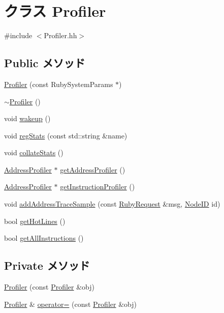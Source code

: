 \hypertarget{classProfiler}{
\section{クラス Profiler}
\label{classProfiler}
}


{\ttfamily \#include $<$Profiler.hh$>$}\subsection*{Public メソッド}
\begin{DoxyCompactItemize}
\item 
\hyperlink{classProfiler_ab2c59c9f25786669282690a23306cd69}{Profiler} (const RubySystemParams $\ast$)
\item 
\hyperlink{classProfiler_aa0f87e10a29a76f6358f43b09621df51}{$\sim$Profiler} ()
\item 
void \hyperlink{classProfiler_ae674290a26ecbd622c5160e38e8a4fe9}{wakeup} ()
\item 
void \hyperlink{classProfiler_a3dd3443357312bcb75580eaa508c48a4}{regStats} (const std::string \&name)
\item 
void \hyperlink{classProfiler_a208669cbc0bb1d52565956ca8c690c55}{collateStats} ()
\item 
\hyperlink{classAddressProfiler}{AddressProfiler} $\ast$ \hyperlink{classProfiler_a380304db5e7667dff1ac27da6e26a220}{getAddressProfiler} ()
\item 
\hyperlink{classAddressProfiler}{AddressProfiler} $\ast$ \hyperlink{classProfiler_a5dc719d0d14855b6886f05bf4f1806e2}{getInstructionProfiler} ()
\item 
void \hyperlink{classProfiler_a0a3e52657e723b58457b1dca1c10e01c}{addAddressTraceSample} (const \hyperlink{classRubyRequest}{RubyRequest} \&msg, \hyperlink{TypeDefines_8hh_a83c14b4ae37e80071f6b3506a6c46151}{NodeID} id)
\item 
bool \hyperlink{classProfiler_a51d84ccca8b5f090c1f01ce24d53895c}{getHotLines} ()
\item 
bool \hyperlink{classProfiler_a2468f3f3e9df68e9adff81a531e78795}{getAllInstructions} ()
\end{DoxyCompactItemize}
\subsection*{Private メソッド}
\begin{DoxyCompactItemize}
\item 
\hyperlink{classProfiler_a790e796e0ecb72b0d281875555505219}{Profiler} (const \hyperlink{classProfiler}{Profiler} \&obj)
\item 
\hyperlink{classProfiler}{Profiler} \& \hyperlink{classProfiler_a60b8f0ed1eda481bdc0c0652cb27a7bf}{operator=} (const \hyperlink{classProfiler}{Profiler} \&obj)
\end{DoxyCompactItemize}
